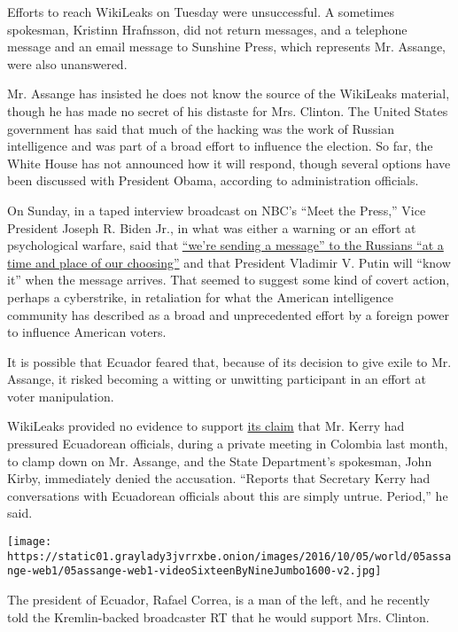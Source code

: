 Efforts to reach WikiLeaks on Tuesday were unsuccessful. A sometimes
spokesman, Kristinn Hrafnsson, did not return messages, and a telephone
message and an email message to Sunshine Press, which represents Mr.
Assange, were also unanswered.

Mr. Assange has insisted he does not know the source of the WikiLeaks
material, though he has made no secret of his distaste for Mrs. Clinton.
The United States government has said that much of the hacking was the
work of Russian intelligence and was part of a broad effort to influence
the election. So far, the White House has not announced how it will
respond, though several options have been discussed with President
Obama, according to administration officials.

On Sunday, in a taped interview broadcast on NBC's ``Meet the Press,''
Vice President Joseph R. Biden Jr., in what was either a warning or an
effort at psychological warfare, said that
\href{http://www.nytimes3xbfgragh.onion/2016/10/16/us/politics/biden-hints-at-us-response-to-cyberattacks-blamed-on-russia.html}{``we're
sending a message'' to the Russians ``at a time and place of our
choosing''} and that President Vladimir V. Putin will ``know it'' when
the message arrives. That seemed to suggest some kind of covert action,
perhaps a cyberstrike, in retaliation for what the American intelligence
community has described as a broad and unprecedented effort by a foreign
power to influence American voters.

It is possible that Ecuador feared that, because of its decision to give
exile to Mr. Assange, it risked becoming a witting or unwitting
participant in an effort at voter manipulation.

WikiLeaks provided no evidence to support
\href{https://twitter.com/wikileaks/status/788369924175441920}{its
claim} that Mr. Kerry had pressured Ecuadorean officials, during a
private meeting in Colombia last month, to clamp down on Mr. Assange,
and the State Department's spokesman, John Kirby, immediately denied the
accusation. ``Reports that Secretary Kerry had conversations with
Ecuadorean officials about this are simply untrue. Period,'' he said.

\texttt{[image: https://static01.graylady3jvrrxbe.onion/images/2016/10/05/world/05assange-web1/05assange-web1-videoSixteenByNineJumbo1600-v2.jpg]}

The president of Ecuador, Rafael Correa, is a man of the left, and he
recently told the Kremlin-backed broadcaster RT that he would support
Mrs. Clinton.

